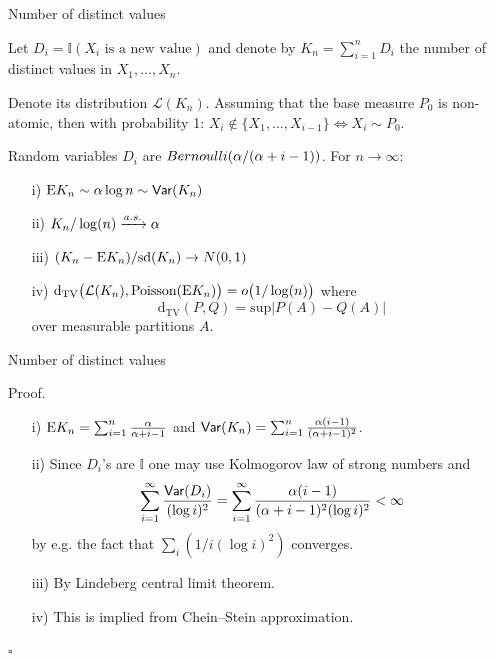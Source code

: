 \begin{frame}{Number of distinct values}


Let $D_i =  \mathbb{I}(X_i \text{ is a new value})$ and denote by $K_n=\sum_{i=1}^nD_i$ the \alert{number of distinct values} in $X_1,\ldots, X_n$.

Denote its distribution $\mathcal{L}(K_n)$. Assuming that the base measure $P_0$ is non-atomic, then  with probability 1:
$X_i\notin\{X_1,\ldots, X_{i-1}\} \Leftrightarrow X_i \sim P_0$.

\pause 

\begin{proposition}
Random variables $D_i$ are \alert{$Bernoulli(\alpha/(\alpha + i - 1))$}. For $n\rightarrow \infty$:
\begin{enumerate}
    \item[i)] $\mathrm{E} K_n\sim \alpha \log n \sim \mathsf{Var}(K_n)$
    \item[ii)] $K_n/\log(n)\xrightarrow{a.s.} \alpha$
    \item[iii)] $(K_n - \mathrm{E} K_n)/\text{sd}(K_n)\rightarrow N(0,1) $
    \item[iv)] $\text{d}_{\text{TV}}\big( \mathcal{L}(K_n), \text{Poisson}(\mathrm{E} K_n) \big)=o \big(1 / \log(n)\big)$ where $$
    \text{d}_{\text{TV}}(P,Q)=\text{sup}|P(A)-Q(A)|
    $$
    over measurable  partitions $A$.
\end{enumerate}
\end{proposition}

\end{frame}



\begin{frame}{Number of distinct values}

\alert{Proof.}
\begin{enumerate}
    \item[i)] $\mathrm{E} K_n = \sum_{i=1}^n \frac{\alpha}{\alpha+i-1} $ and $ \mathsf{Var}(K_n) = \sum_{i=1}^n\frac{\alpha(i-1)}{(\alpha + i -1)^2}$.
    \item[ii)] Since $D_i$'s are $\mathbb{I}$ one may use Kolmogorov law of strong numbers and 
    $$
    \sum_{i=1}^\infty \frac{\mathsf{Var} (D_i)}{ (\log i)^2 }= \sum_{i=1}^\infty \frac{\alpha(i-1)}{(\alpha +i-1)^2 (\log i)^2}<\infty$$
    by e.g. the fact that $\sum_i (1/i(\log i)^2)$ converges.
    \item[iii)]By Lindeberg central limit theorem.
    \item[iv)] This is implied from Chein--Stein approximation. %
\end{enumerate}
\hfill $\square$
\end{frame}



